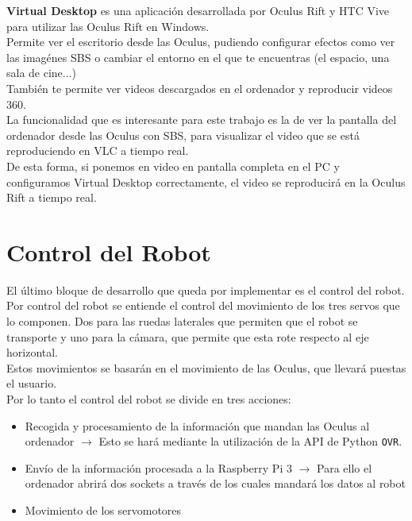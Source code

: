 \documentclass[twoside, 11pt]{epstfg}
\begin{document}
\textbf{Virtual Desktop} es una aplicación desarrollada por Oculus Rift y  HTC Vive para utilizar las Oculus Rift en Windows.\\
Permite ver el escritorio desde las Oculus, pudiendo configurar efectos como ver las imagénes SBS o cambiar el entorno en el que te encuentras (el espacio, una sala de cine...)\\También te permite ver videos descargados en el ordenador y reproducir videos 360.\\
La funcionalidad que es interesante para este trabajo es la de ver la pantalla del ordenador desde las Oculus con SBS, para visualizar el video que se está reproduciendo en VLC a tiempo real.\\
De esta forma, si ponemos en video en pantalla completa en el PC y configuramos Virtual Desktop correctamente, el video se reproducirá en la Oculus Rift a tiempo real.





\section{Control del Robot}
El último bloque de desarrollo que queda por implementar es el control del robot. Por control del robot se entiende el control del movimiento de los tres servos que lo componen. Dos para las ruedas laterales que permiten que el robot se transporte y uno para la cámara, que permite que esta rote respecto al eje horizontal.\\
Estos movimientos se basarán en el movimiento de las Oculus, que llevará puestas el usuario.\\
Por lo tanto el control del robot se divide en tres acciones:
\begin{itemize}
	\item Recogida y procesamiento de la información que mandan las Oculus al ordenador $\rightarrow$ Esto se hará mediante la utilización de la API de Python \texttt{OVR}.
	
	\item Envío de la información procesada a la Raspberry Pi 3 $\rightarrow$ Para ello el ordenador abrirá dos sockets a través de los cuales mandará los datos al robot
	
	\item Movimiento de los servomotores
\end{itemize}
\end{document}
